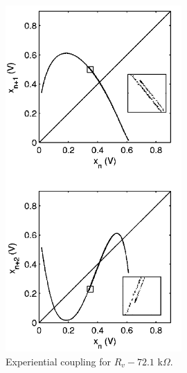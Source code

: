 \begin{minipage}{0.45\textwidth}
    \begin{figure}[h]
        \centering
        \includegraphics[width=0.6\textwidth]{images/e_double.png}
        \caption{Experiential coupling for $R_v - 72.1$ k$\Omega$.}
    \end{figure}
    
\end{minipage}
